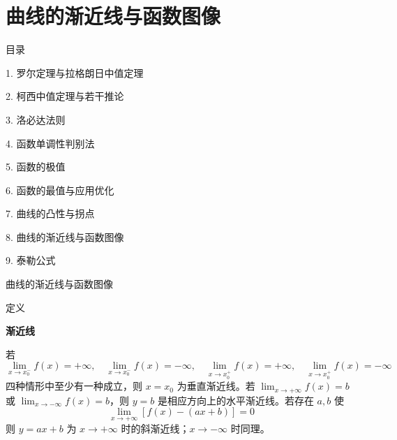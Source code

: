 \documentclass[aspectratio=169,10pt,fontset=fandol]{ctexbeamer}
\begin{document}
\section{曲线的渐近线与函数图像}
\begin{frame}[t,fragile]{目录}
\normalsize
{\color{black}\normalsize 1. 罗尔定理与拉格朗日中值定理\par}\vspace{0.22em}
{\color{black}\normalsize 2. 柯西中值定理与若干推论\par}\vspace{0.22em}
{\color{black}\normalsize 3. 洛必达法则\par}\vspace{0.22em}
{\color{black}\normalsize 4. 函数单调性判别法\par}\vspace{0.22em}
{\color{black}\normalsize 5. 函数的极值\par}\vspace{0.22em}
{\color{black}\normalsize 6. 函数的最值与应用优化\par}\vspace{0.22em}
{\color{black}\normalsize 7. 曲线的凸性与拐点\par}\vspace{0.22em}
{\color{blue}\normalsize 8. 曲线的渐近线与函数图像\par}\vspace{0.22em}
{\color{gray!40}\normalsize 9. 泰勒公式\par}\vspace{0.22em}
\end{frame}
\begin{frame}[t,fragile]{曲线的渐近线与函数图像}
\normalsize
\begin{block}{定义}
{\normalsize
\textbf{渐近线}\par

若
\[
\lim_{x\to x_0^-}f(x)=+\infty,\quad
\lim_{x\to x_0^-}f(x)=-\infty,\quad
\lim_{x\to x_0^+}f(x)=+\infty,\quad
\lim_{x\to x_0^+}f(x)=-\infty
\]
四种情形中至少有一种成立，则 $x=x_0$ 为垂直渐近线。若 $\lim_{x\to+\infty}f(x)=b$ 或 $\lim_{x\to-\infty}f(x)=b$，则 $y=b$ 是相应方向上的水平渐近线。若存在 $a,b$ 使
\[
\lim_{x\to+\infty}[f(x)-(ax+b)]=0
\]
则 $y=ax+b$ 为 $x\to+\infty$ 时的斜渐近线；$x\to-\infty$ 时同理。

}
\end{block}
\end{frame}
\end{document}
